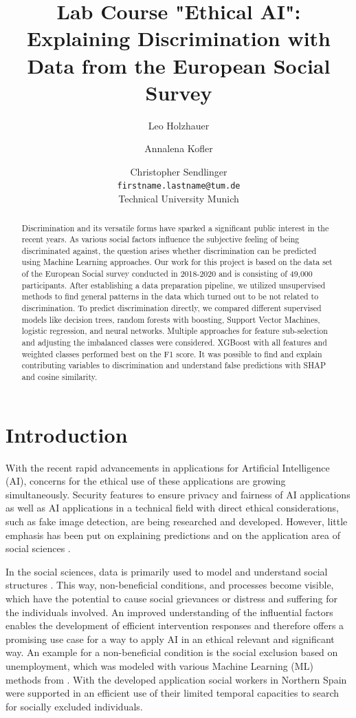 \documentclass[10pt]{article}
\title{Lab Course "Ethical AI": Explaining Discrimination with Data from the European Social Survey}
\author{Leo Holzhauer \and Annalena Kofler \and Christopher Sendlinger\\
	\texttt{firstname.lastname@tum.de}\\
	Technical University Munich}
\begin{document}
	\maketitle
	
	\begin{abstract} %
		Discrimination and its versatile forms have sparked a significant public interest in the recent years. As various social factors influence the subjective feeling of being discriminated against, the question arises whether discrimination can be predicted using Machine Learning approaches.  
		Our work for this project is based on the data set of the European Social survey conducted in 2018-2020 and is consisting of	49,000 participants. After establishing a data preparation pipeline, we utilized unsupervised methods to find general patterns in the data which turned out to be not related to discrimination. To predict discrimination directly, we compared different supervised models like decision trees, random forests with boosting, Support Vector Machines, logistic regression, and neural networks. Multiple approaches for feature sub-selection and adjusting the imbalanced classes were considered. XGBoost with all features and weighted classes performed best on the F1 score. It was possible to find and explain contributing variables to discrimination and understand false predictions with SHAP and cosine similarity. 
	\end{abstract}
	
	\section{Introduction} %
	With the recent rapid advancements in applications for Artificial Intelligence (AI), concerns for the ethical use of these applications are growing simultaneously. Security features to ensure privacy and fairness of AI applications as well as AI applications in a technical field with direct ethical considerations, such as fake image detection, are being researched and developed. However, little emphasis has been put on explaining predictions and on the application area of social sciences \citep{grimmer:2021}.
	
	In the social sciences, data is primarily used to model and understand social structures \citep{grimmer:2021}. This way, non-beneficial conditions, and processes become visible, which have the potential to cause social grievances or distress and suffering for the individuals involved. An improved understanding of the influential factors enables the development of efficient intervention responses and therefore offers a promising use case for a way to apply AI in an ethical relevant and significant way. An example for a non-beneficial condition is the social exclusion based on unemployment, which was modeled with various Machine Learning (ML) methods from \citep{serrano:2019-2}. With the developed application social workers in Northern Spain were supported in an efficient use of their limited temporal capacities to search for socially excluded individuals.
	
\end{document}
